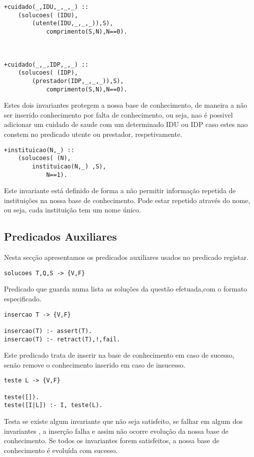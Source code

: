 \documentclass{report}
\begin{document}
\begin{verbatim}
+cuidado(_,IDU,_,_,_) :: 
    (solucoes( (IDU),
        (utente(IDU,_,_,_)),S),
            comprimento(S,N),N==0).



+cuidado(_,_,IDP,_,_) :: 
    (solucoes( (IDP),
        (prestador(IDP,_,_,_)),S),
            comprimento(S,N),N==0).
\end{verbatim}
Estes dois invariantes protegem a nossa base de conhecimento, de maneira a não ser inserido conhecimento por falta de conhecimento, ou seja, nao é possivel adicionar um cuidado de saude com um determinado IDU ou IDP caso estes nao constem no predicado utente ou prestador, respetivamente.
\bigbreak

\begin{verbatim}
+instituicao(N,_) :: 
    (solucoes( (N), 
        instituicao(N,_) ,S), 
            N==1).
\end{verbatim}
Este invariante está definido de forma a não permitir informação repetida de instituições na nossa base de conhecimento. Pode estar repetido através do nome, ou seja, cada instituição tem um nome único.
\bigbreak

\subsection{Predicados Auxiliares}

Nesta secção apresentamos os predicados auxiliares usados no predicado registar.


\begin{verbatim}
solucoes T,Q,S -> {V,F}
\end{verbatim}

Predicado que guarda numa lista as soluções da questão efetuada,com o formato especificado.

\begin{verbatim}
insercao T -> {V,F}

insercao(T) :- assert(T).
insercao(T) :- retract(T),!,fail.
\end{verbatim}

Este predicado trata de inserir na base de conhecimento em caso de sucesso, senão remove o conhecimento inserido em caso de insucesso.

\begin{verbatim}
teste L -> {V,F}

teste([]).
teste([I|L]) :- I, teste(L).
\end{verbatim}

Testa se existe algum invariante que não seja satisfeito, se falhar em algum dos invariantes , a inserção falha e assim não ocorre evolução da nossa base de conhecimento. Se todos os invariantes forem satisfeitos, a nossa base de conhecimento é evoluída com sucesso.
\end{document}
